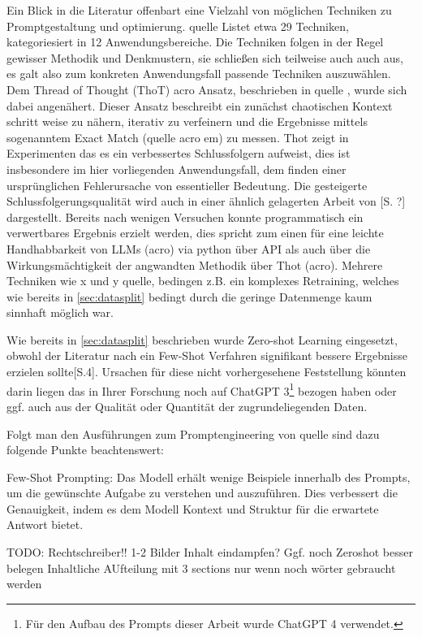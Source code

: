 Ein Blick in die Literatur offenbart eine Vielzahl von möglichen Techniken zu Promptgestaltung und optimierung. quelle Listet etwa 29 Techniken, kategoriesiert in 12 Anwendungsbereiche\autocite[S. 3]{Sahoo2024}. Die Techniken folgen in der Regel gewisser Methodik und Denkmustern, sie schließen sich teilweise auch auch aus, es galt also zum konkreten Anwendungsfall passende Techniken auszuwählen. Dem Thread of Thought (ThoT) acro Ansatz, beschrieben in quelle \autocite{Zhou2023}, wurde sich dabei angenähert. Dieser Ansatz beschreibt ein zunächst chaotischen Kontext schritt weise zu nähern, iterativ zu verfeinern und die Ergebnisse mittels sogenanntem Exact Match (quelle acro em) zu messen. Thot zeigt in Experimenten das es ein verbessertes Schlussfolgern aufweist, dies ist insbesondere im hier vorliegenden Anwendungsfall, dem finden einer ursprünglichen Fehlerursache von essentieller Bedeutung. Die gesteigerte Schlussfolgerungsqualität wird auch in einer ähnlich gelagerten Arbeit von \autocite{Wei2022}[S. ?] dargestellt. Bereits nach wenigen Versuchen konnte programmatisch ein verwertbares Ergebnis erzielt werden, dies spricht zum einen für eine leichte Handhabbarkeit von LLMs (acro) via python über API als auch über die Wirkungsmächtigkeit der angwandten Methodik über Thot (acro). Mehrere Techniken wie x und y quelle, bedingen z.B. ein komplexes Retraining, welches wie bereits in \autoref{sec:datasplit} bedingt durch die geringe Datenmenge kaum sinnhaft möglich war.

Wie bereits in \autoref{sec:datasplit} beschrieben wurde Zero-shot Learning eingesetzt, obwohl der Literatur nach ein Few-Shot Verfahren signifikant bessere Ergebnisse erzielen sollte\autocite{Brown2020}[S.4]. Ursachen für diese nicht vorhergesehene Feststellung könnten darin liegen das \citeauthor{Brown2020} in Ihrer Forschung noch auf ChatGPT 3\footnote{Für den Aufbau des Prompts dieser Arbeit wurde ChatGPT 4 verwendet.} bezogen haben oder ggf. auch aus der Qualität oder Quantität der zugrundeliegenden Daten.



Folgt man den Ausführungen zum Promptengineering von quelle sind dazu folgende Punkte beachtenswert:

Few-Shot Prompting: Das Modell erhält wenige Beispiele innerhalb des Prompts, um die gewünschte Aufgabe zu verstehen und auszuführen. Dies verbessert die Genauigkeit, indem es dem Modell Kontext und Struktur für die erwartete Antwort bietet. 

TODO:
Rechtschreiber!!
1-2 Bilder
Inhalt eindampfen?
Ggf. noch Zeroshot besser belegen
Inhaltliche AUfteilung mit 3 sections nur wenn noch wörter gebraucht werden
